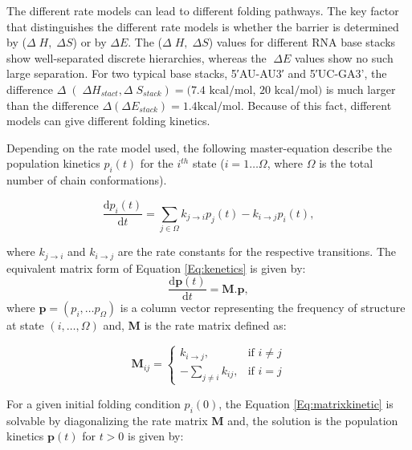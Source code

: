 The different rate models can lead to different folding pathways. The key factor that distinguishes the different rate models is whether the barrier is determined by ($\Delta 􏰦H, 􏰦\Delta S$) or by $\Delta E$. The  ($\Delta 􏰦H, 􏰦\Delta S$) values for different RNA base stacks show well-separated discrete hierarchies, whereas the $􏰦\Delta E$ values show no such large separation. For two typical base stacks, 5′AU-AU3′ and 5′UC-GA3', the difference $ \Delta 􏰦(􏰦\Delta H_{stact}, \Delta 􏰦S_{stack}) = (7.4 \text{ kcal/mol}$, $20 \text{ kcal/mol})$ is much larger than the difference  $\Delta (\Delta E_{stack})=1.4 \text{kcal/mol}$\cite{serra199511}. Because of this fact, different models can give different folding kinetics.

Depending on the rate model used, the following master-equation describe the population kinetics $p_i(t)$ for the $i^{th}$ state ($i=1\dots \Omega$, where $\Omega$ is the total number of chain conformations).

\begin{equation}
\label{Eq:kenetics}
\frac{\text{d}p_i(t)}{\text{d}t} = \sum\limits_{j \in \Omega}
k_{j \rightarrow i} p_{j}(t) - k_{i \rightarrow j} p_{i}(t),
\end{equation}

where $k_{j\rightarrow i}$ and $k_{i \rightarrow j}$ are the rate constants for the respective transitions. The equivalent matrix form of Equation \ref{Eq:kenetics} is given by: 
\begin{equation}
\label{Eq:matrixkinetic}
	\frac{\text{d}\textbf{p}(t)}{\text{d}t} = \textbf{M} . \textbf{p},
\end{equation}
where $\textbf{p} = (p_i, \dots p_{\Omega})$ is a column vector representing the frequency of structure at state $(i, \dots , \Omega)$ and, \textbf{M} is the rate matrix defined as: 

\begin{equation}
	\textbf{M}_{ij} =  \begin{cases}
	k_{i\rightarrow j},& \text{if } i\neq j\\
	- \sum_{j\neq i}{k_{ij}},              & \text{if } i=j
	\end{cases}
\end{equation}

For a given initial folding condition $p_i(0)$, the Equation \ref{Eq:matrixkinetic} is solvable by diagonalizing the rate matrix \textbf{M} and, the solution is the population kinetics $\textbf{p}(t)$ for $t>0$ is given by: 

